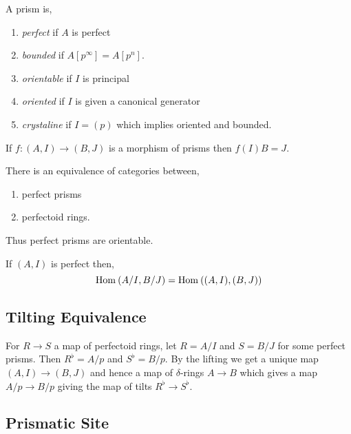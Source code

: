 \documentclass[12pt]{article}
\begin{document}
\begin{defn}
A prism is,
\begin{enumerate}
\item \textit{perfect} if $A$ is perfect
\item \textit{bounded} if $A[p^\infty] = A[p^n]$.
\item \textit{orientable} if $I$ is principal
\item \textit{oriented} if $I$ is given a canonical generator
\item \textit{crystaline} if $I = (p)$ which implies oriented and bounded.
\end{enumerate}
\end{defn}

\begin{prop}
If $f : (A, I) \to (B, J)$ is a morphism of prisms then $f(I) B = J$.
\end{prop}

\begin{theorem}
There is an equivalence of categories between,
\begin{enumerate}
\item perfect prisms
\item perfectoid rings.
\end{enumerate}
\end{theorem}

\begin{rmk}
Thus perfect prisms are orientable. 
\end{rmk}

\begin{prop}
If $(A, I)$ is perfect then,
\[ \mathrm{Hom}_{} \left( A/I, B/J \right) = \mathrm{Hom}_{} \left( (A,I), (B,J) \right) \]
\end{prop}

\subsection{Tilting Equivalence}

For $R \to S$ a map of perfectoid rings, let $R = A/I$ and $S = B/J$ for some perfect prisms. Then $R^\flat = A / p$ and $S^\flat = B / p$. By the lifting we get a unique map $(A, I) \to (B, J)$ and hence a map of $\delta$-rings $A \to B$ which gives a map $A/p \to B/p$ giving the map of tilts $R^{\flat} \to S^{\flat}$. 

\subsection{Prismatic Site}
\end{document}
